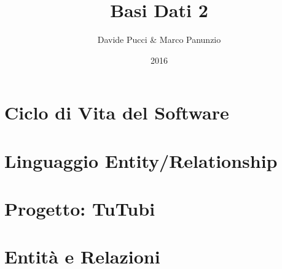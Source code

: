 

\title{Basi Dati 2}
\author{Davide Pucci \& Marco Panunzio}
\date{2016}

\maketitle

\tableofcontents

\chapter{Ciclo di Vita del Software}


\chapter{Linguaggio Entity/Relationship}


\chapter{Progetto: TuTubi}


\chapter{Entità e Relazioni}


